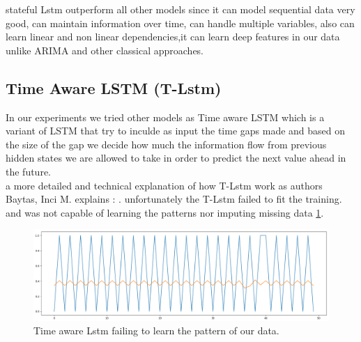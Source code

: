 stateful Lstm outperform all other models since it can model sequential data very good, can maintain information over time, can handle multiple variables, also can learn linear and non linear dependencies,it can  learn deep features in our data unlike ARIMA and other classical approaches.

\subsection{Time Aware LSTM (T-Lstm) }
In our experiments we tried other models as Time aware LSTM \cite{timeaware} which is a variant of  LSTM that try to inculde as input the time gaps made and based on the size of the gap we decide how  much the information flow from previous hidden states we are allowed to take in order to predict the next value ahead in the future.\\a more detailed and technical explanation of how T-Lstm work as authors  Baytas, Inci M.\cite{timeaware} explains : .
unfortunately the T-Lstm failed to fit the training. and was not capable of learning the patterns nor imputing missing data \ref{fig:tlstm}.
\begin{figure}[H]
\centering
\includegraphics[scale=.45]{img/T_lstm.png}  
\caption{Time aware Lstm failing to learn the pattern of our data.}
\label{fig:tlstm}
\end{figure}

